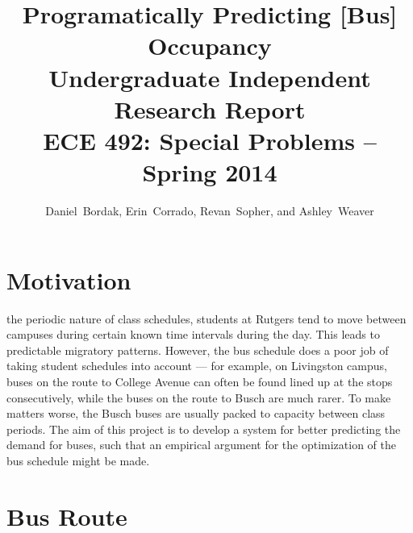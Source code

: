 \documentclass[12pt,journal,compsoc]{IEEEtran} %
\begin{document}
\title{Programatically Predicting [Bus] Occupancy\\[-2mm]
{\large Undergraduate Independent Research Report}\\[-3mm]
{\large ECE 492: Special Problems -- Spring 2014}}
\author{Daniel~Bordak, Erin~Corrado, Revan~Sopher, and Ashley~Weaver}


\maketitle


\section{Motivation}

 the periodic nature of class schedules, students at Rutgers tend to move between campuses during certain known time intervals during the day.
This leads to predictable migratory patterns.
However, the bus schedule does a poor job of taking student schedules into account --- for example, on Livingston campus, buses on the route to College Avenue can often be found lined up at the stops consecutively, while the buses on the route to Busch are much rarer.
To make matters worse, the Busch buses are usually packed to capacity between class periods.
The aim of this project is to develop a system for better predicting the demand for buses, such that an empirical argument for the optimization of the bus schedule might be made.



\section{Bus Route}
\end{document}
